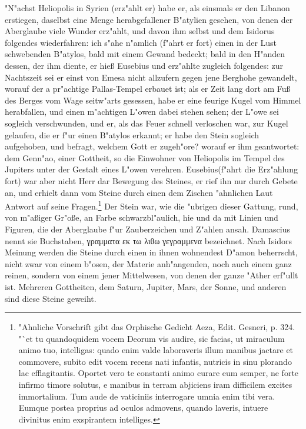 \documentclass[a4paper, 11pt, oneside, polutonikogreek, german]{article}
\begin{document}
"N"achst Heliopolis in Syrien (erz"ahlt er) habe er, als einsmals er den Libanon erstiegen, daselbst eine Menge herabgefallener B"atylien gesehen, von denen der Aberglaube viele Wunder erz"ahlt, und davon ihm selbst und dem Isidorus folgendes wiederfahren: ich s"ahe n"amlich (f"ahrt er fort) einen in der Lust schwebenden B"atylos, bald mit einem Gewand bedeckt; bald in den H"anden dessen, der ihm diente, er hieß Eusebius und erz"ahlte zugleich folgendes: zur Nachtszeit sei er einst von Emesa nicht allzufern gegen jene Berghohe gewandelt, worauf der a pr"achtige Pallas-Tempel erbauet ist; als er Zeit lang dort am Fuß des Berges vom Wage seitw"arts gesessen, habe er eine feurige Kugel vom Himmel herabfallen, und einen m"achtigen L"owen dabei stehen sehen; der L"owe sei sogleich verschwunden, und er, als das Feuer schnell verloschen war, zur Kugel gelaufen, die er f"ur einen B"atylos erkannt; er habe den Stein sogleich aufgehoben, und befragt, welchem Gott er zugeh"ore? worauf er ihm geantwortet: dem Genn"ao, einer Gottheit, so die Einwohner von Heliopolis im Tempel des Jupiters unter der Gestalt eines L"owen verehren. Eusebius(f"ahrt die Erz"ahlung fort) war aber nicht Herr dar Bewegung des Steines, er rief ihn nur durch Gebete an, und erhielt dann vom Steine durch einen dem Zischen "ahnlichen Laut Antwort auf seine Fragen.\footnote{"Ahnliche Vorschrift gibt das Orphische Gedicht Aeza, Edit. Gesneri, p. 324. "`et tu quandoquidem vocem Deorum vis audire, sic facias, ut miraculum animo tuo, intelligas: quado enim valde laboraveris illum manibus jactare et commovere, subito edit vocem recens nati infantis, nutricis in sinu plorando lac efflagitantis. Oportet vero te constanti animo curare eum semper, ne forte infirmo timore solutus, e manibus in terram abjiciens iram difficilem excites immortalium. Tum aude de vaticiniis interrogare umnia enim tibi vera. Eumque postea proprius ad oculos admovens, quando laveris, intuere divinitus enim exspirantem intelliges.} Der Stein war, wie die "ubrigen dieser Gattung, rund, von m"aßiger Gr"oße, an Farbe schwarzbl"aulich, hie und da mit Linien und Figuren, die der Aberglaube f"ur Zauberzeichen und Z"ahlen ansah. Damascius nennt sie Buchstaben, γραμματα εκ τω λιθω γεγραμμενα bezeichnet. Nach Isidors Meinung werden die Steine durch einen in ihnen wohnendest D"amon beherrscht, nicht zwar von einem b"osen, der Materie anh"angenden, noch auch einem ganz reinen, sondern von einem jener Mittelwesen, von denen der ganze "Ather erf"ullt ist. Mehreren Gottheiten, dem Saturn, Jupiter, Mars, der Sonne, und anderen sind diese Steine geweiht.
\end{document}
